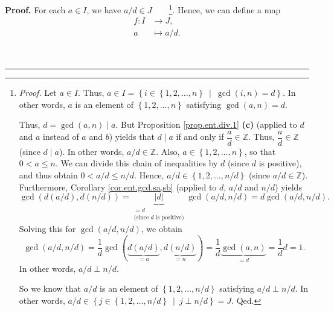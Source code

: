 \documentclass[numbers=enddot,12pt,final,onecolumn,notitlepage]{scrartcl}%
\numberwithin{exer}{subsection}
\theoremstyle{definition}
\newenvironment{proof}[1][Proof]{\noindent\textbf{#1.} }{\ \rule{0.5em}{0.5em}}
\begin{document}
\begin{proof}
For each $a\in I$, we have $a/d\in J$\ \ \ \ \footnote{\textit{Proof.} Let
$a\in I$. Thus, $a\in I=\left\{  i\in\left\{  1,2,\ldots,n\right\}
\ \mid\ \gcd\left(  i,n\right)  =d\right\}  $. In other words, $a$ is an
element of $\left\{  1,2,\ldots,n\right\}  $ satisfying $\gcd\left(
a,n\right)  =d$.
\par
Thus, $d=\gcd\left(  a,n\right)  \mid a$. But Proposition \ref{prop.ent.div.1}
\textbf{(c)} (applied to $d$ and $a$ instead of $a$ and $b$) yields that
$d\mid a$ if and only if $\dfrac{a}{d}\in\mathbb{Z}$. Thus, $\dfrac{a}{d}%
\in\mathbb{Z}$ (since $d\mid a$). In other words, $a/d\in\mathbb{Z}$. Also,
$a\in\left\{  1,2,\ldots,n\right\}  $, so that $0<a\leq n$. We can divide this
chain of inequalities by $d$ (since $d$ is positive), and thus obtain
$0<a/d\leq n/d$. Hence, $a/d\in\left\{  1,2,\ldots,n/d\right\}  $ (since
$a/d\in\mathbb{Z}$). Furthermore, Corollary \ref{cor.ent.gcd.sa,sb} (applied
to $d$, $a/d$ and $n/d$) yields%
\[
\gcd\left(  d\left(  a/d\right)  ,d\left(  n/d\right)  \right)
=\underbrace{\left\vert d\right\vert }_{\substack{=d\\\text{(since }d\text{ is
positive)}}}\gcd\left(  a/d,n/d\right)  =d\gcd\left(  a/d,n/d\right)  .
\]
Solving this for $\gcd\left(  a/d,n/d\right)  $, we obtain%
\[
\gcd\left(  a/d,n/d\right)  =\dfrac{1}{d}\gcd\left(  \underbrace{d\left(
a/d\right)  }_{=a},\underbrace{d\left(  n/d\right)  }_{=n}\right)  =\dfrac
{1}{d}\underbrace{\gcd\left(  a,n\right)  }_{=d}=\dfrac{1}{d}d=1.
\]
In other words, $a/d\perp n/d$.
\par
So we know that $a/d$ is an element of $\left\{  1,2,\ldots,n/d\right\}  $
satisfying $a/d\perp n/d$. In other words, $a/d\in\left\{  j\in\left\{
1,2,\ldots,n/d\right\}  \ \mid\ j\perp n/d\right\}  =J$. Qed.}. Hence, we can
define a map%
\begin{align*}
f:I  &  \rightarrow J,\\
a  &  \mapsto a/d.
\end{align*}



\end{proof}
\end{document}
